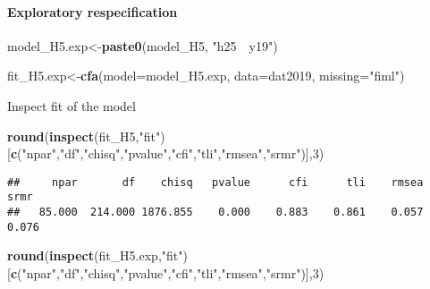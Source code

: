 \documentclass[
]{article}
\newenvironment{Shaded}{\begin{snugshade}}{\end{snugshade}}
\newcommand{\DataTypeTok}[1]{\textcolor[rgb]{0.13,0.29,0.53}{#1}}
\newcommand{\DecValTok}[1]{\textcolor[rgb]{0.00,0.00,0.81}{#1}}
\newcommand{\KeywordTok}[1]{\textcolor[rgb]{0.13,0.29,0.53}{\textbf{#1}}}
\newcommand{\NormalTok}[1]{#1}
\newcommand{\StringTok}[1]{\textcolor[rgb]{0.31,0.60,0.02}{#1}}
\begin{document}
\hypertarget{exploratory-respecification-1}{%
\paragraph{Exploratory
respecification}\label{exploratory-respecification-1}}

\begin{Shaded}
\begin{Highlighting}[]
\NormalTok{model_H5.exp<-}\KeywordTok{paste0}\NormalTok{(model_H5,}
                      \StringTok{"h25~~y19"}\NormalTok{)}
\end{Highlighting}
\end{Shaded}

\begin{Shaded}
\begin{Highlighting}[]
\NormalTok{fit_H5.exp<-}\KeywordTok{cfa}\NormalTok{(}\DataTypeTok{model=}\NormalTok{model_H5.exp,}
              \DataTypeTok{data=}\NormalTok{dat2019,}
              \DataTypeTok{missing=}\StringTok{"fiml"}\NormalTok{)}
\end{Highlighting}
\end{Shaded}

Inspect fit of the model

\begin{Shaded}
\begin{Highlighting}[]
\KeywordTok{round}\NormalTok{(}\KeywordTok{inspect}\NormalTok{(fit_H5,}\StringTok{"fit"}\NormalTok{)}
\NormalTok{      [}\KeywordTok{c}\NormalTok{(}\StringTok{"npar"}\NormalTok{,}\StringTok{"df"}\NormalTok{,}\StringTok{"chisq"}\NormalTok{,}\StringTok{"pvalue"}\NormalTok{,}\StringTok{"cfi"}\NormalTok{,}\StringTok{"tli"}\NormalTok{,}\StringTok{"rmsea"}\NormalTok{,}\StringTok{"srmr"}\NormalTok{)],}\DecValTok{3}\NormalTok{)}
\end{Highlighting}
\end{Shaded}

\begin{verbatim}
##     npar       df    chisq   pvalue      cfi      tli    rmsea     srmr 
##   85.000  214.000 1876.855    0.000    0.883    0.861    0.057    0.076
\end{verbatim}

\begin{Shaded}
\begin{Highlighting}[]
\KeywordTok{round}\NormalTok{(}\KeywordTok{inspect}\NormalTok{(fit_H5.exp,}\StringTok{"fit"}\NormalTok{)}
\NormalTok{      [}\KeywordTok{c}\NormalTok{(}\StringTok{"npar"}\NormalTok{,}\StringTok{"df"}\NormalTok{,}\StringTok{"chisq"}\NormalTok{,}\StringTok{"pvalue"}\NormalTok{,}\StringTok{"cfi"}\NormalTok{,}\StringTok{"tli"}\NormalTok{,}\StringTok{"rmsea"}\NormalTok{,}\StringTok{"srmr"}\NormalTok{)],}\DecValTok{3}\NormalTok{)}
\end{Highlighting}
\end{Shaded}
\end{document}
